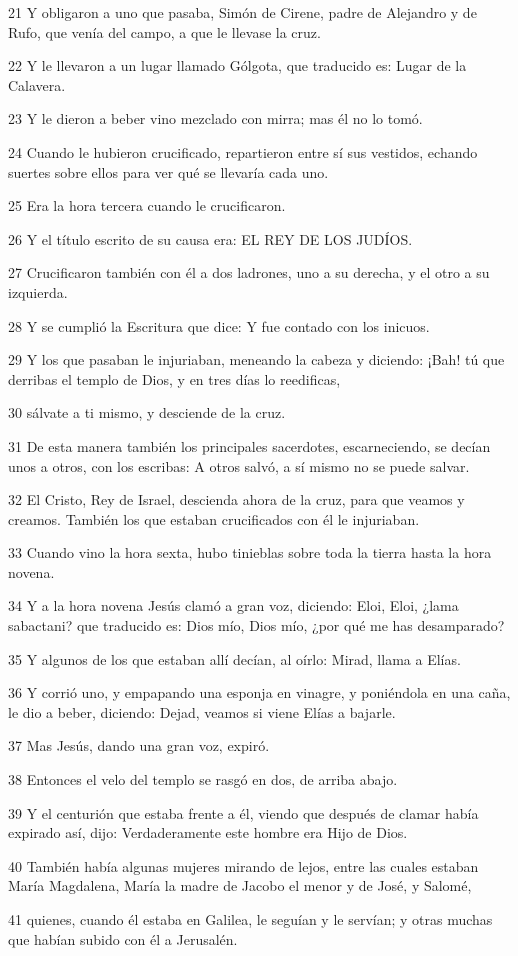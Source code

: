 \par 21 Y obligaron a uno que pasaba, Simón de Cirene, padre de Alejandro y de Rufo, que venía del campo, a que le llevase la cruz.
\par 22 Y le llevaron a un lugar llamado Gólgota, que traducido es: Lugar de la Calavera.
\par 23 Y le dieron a beber vino mezclado con mirra; mas él no lo tomó.
\par 24 Cuando le hubieron crucificado, repartieron entre sí sus vestidos, echando suertes sobre ellos para ver qué se llevaría cada uno.
\par 25 Era la hora tercera cuando le crucificaron.
\par 26 Y el título escrito de su causa era: EL REY DE LOS JUDÍOS.
\par 27 Crucificaron también con él a dos ladrones, uno a su derecha, y el otro a su izquierda.
\par 28 Y se cumplió la Escritura que dice: Y fue contado con los inicuos.
\par 29 Y los que pasaban le injuriaban, meneando la cabeza y diciendo: ¡Bah! tú que derribas el templo de Dios, y en tres días lo reedificas,
\par 30 sálvate a ti mismo, y desciende de la cruz.
\par 31 De esta manera también los principales sacerdotes, escarneciendo, se decían unos a otros, con los escribas: A otros salvó, a sí mismo no se puede salvar.
\par 32 El Cristo, Rey de Israel, descienda ahora de la cruz, para que veamos y creamos. También los que estaban crucificados con él le injuriaban.
\par 33 Cuando vino la hora sexta, hubo tinieblas sobre toda la tierra hasta la hora novena.
\par 34 Y a la hora novena Jesús clamó a gran voz, diciendo: Eloi, Eloi, ¿lama sabactani? que traducido es: Dios mío, Dios mío, ¿por qué me has desamparado?
\par 35 Y algunos de los que estaban allí decían, al oírlo: Mirad, llama a Elías.
\par 36 Y corrió uno, y empapando una esponja en vinagre, y poniéndola en una caña, le dio a beber, diciendo: Dejad, veamos si viene Elías a bajarle.
\par 37 Mas Jesús, dando una gran voz, expiró.
\par 38 Entonces el velo del templo se rasgó en dos, de arriba abajo.
\par 39 Y el centurión que estaba frente a él, viendo que después de clamar había expirado así, dijo: Verdaderamente este hombre era Hijo de Dios.
\par 40 También había algunas mujeres mirando de lejos, entre las cuales estaban María Magdalena, María la madre de Jacobo el menor y de José, y Salomé,
\par 41 quienes, cuando él estaba en Galilea, le seguían y le servían; y otras muchas que habían subido con él a Jerusalén.

